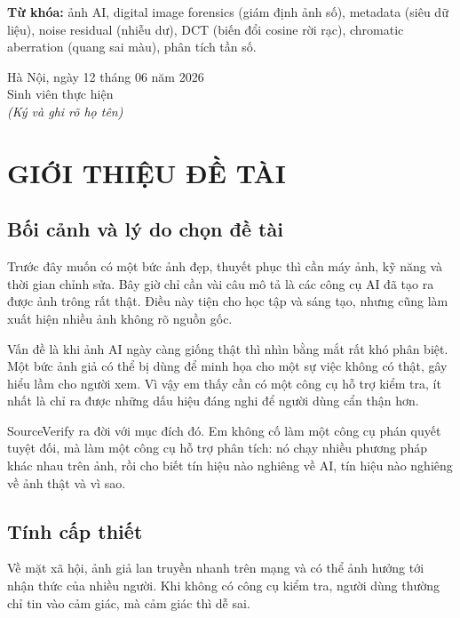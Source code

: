 \documentclass[14pt,a4paper,oneside]{report}
\begin{document}
\textbf{Từ khóa:} ảnh AI, digital image forensics (giám định ảnh số), metadata (siêu dữ liệu), noise residual (nhiễu dư), DCT (biến đổi cosine rời rạc), chromatic aberration (quang sai màu), phân tích tần số.

\begin{flushright}
Hà Nội, ngày 12 tháng 06 năm 2026\\
\vspace{1cm}
Sinh viên thực hiện\\
\textit{(Ký và ghi rõ họ tên)}
\end{flushright}

\tableofcontents
\listoffigures
\listoftables
\clearpage

\setcounter{page}{1}

\chapter{GIỚI THIỆU ĐỀ TÀI}

\section{Bối cảnh và lý do chọn đề tài}
Trước đây muốn có một bức ảnh đẹp, thuyết phục thì cần máy ảnh, kỹ năng và thời gian chỉnh sửa. Bây giờ chỉ cần vài câu mô tả là các công cụ AI đã tạo ra được ảnh trông rất thật. Điều này tiện cho học tập và sáng tạo, nhưng cũng làm xuất hiện nhiều ảnh không rõ nguồn gốc.

Vấn đề là khi ảnh AI ngày càng giống thật thì nhìn bằng mắt rất khó phân biệt. Một bức ảnh giả có thể bị dùng để minh họa cho một sự việc không có thật, gây hiểu lầm cho người xem. Vì vậy em thấy cần có một công cụ hỗ trợ kiểm tra, ít nhất là chỉ ra được những dấu hiệu đáng nghi để người dùng cẩn thận hơn.

SourceVerify ra đời với mục đích đó. Em không cố làm một công cụ phán quyết tuyệt đối, mà làm một công cụ hỗ trợ phân tích: nó chạy nhiều phương pháp khác nhau trên ảnh, rồi cho biết tín hiệu nào nghiêng về AI, tín hiệu nào nghiêng về ảnh thật và vì sao.

\section{Tính cấp thiết}
Về mặt xã hội, ảnh giả lan truyền nhanh trên mạng và có thể ảnh hưởng tới nhận thức của nhiều người. Khi không có công cụ kiểm tra, người dùng thường chỉ tin vào cảm giác, mà cảm giác thì dễ sai.
\end{document}
